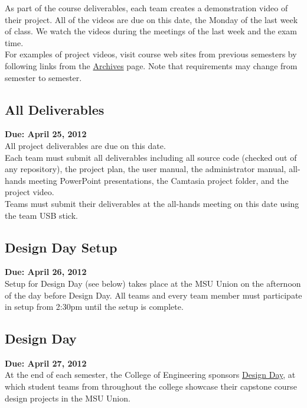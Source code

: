 \documentclass[11pt,a4paper,oneside]{article}
\begin{document}
As part of the course deliverables, each team creates a demonstration video of their project. All of the videos are due on this date, the Monday of the last week of class. We watch the videos during the meetings of the last week and the exam time.\\

For examples of project videos, visit course web sites from previous semesters by following links from the \href{http://www.cse.msu.edu/~cse498/2012-01/archives}{Archives} page. Note that requirements may change from semester to semester.\\

\subsection{All Deliverables}
\textbf{Due: April 25, 2012}\\

All project deliverables are due on this date.\\

Each team must submit all deliverables including all source code (checked out of any repository), the project plan, the user manual, the administrator manual, all-hands meeting PowerPoint presentations, the Camtasia project folder, and the project video.\\

Teams must submit their deliverables at the all-hands meeting on this date using the team USB stick.\\

\subsection{Design Day Setup}
\textbf{Due: April 26, 2012}\\

Setup for Design Day (see below) takes place at the MSU Union on the afternoon of the day before Design Day. All teams and every team member must participate in setup from 2:30pm until the setup is complete.\\

\subsection{Design Day}
\textbf{Due: April 27, 2012}\\

At the end of each semester, the College of Engineering sponsors \href{http://www.cse.msu.edu/~cse498/2012-01/design-day}{Design Day}, at which student teams from throughout the college showcase their capstone course design projects in the MSU Union.\\
\end{document}
